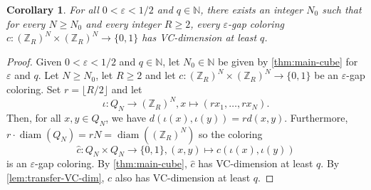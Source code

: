 \documentclass[11pt]{article}
\DeclareMathOperator{\diam}{diam}
\newtheorem{corollary}[theorem]{Corollary}
\theoremstyle{remark}
\begin{document}
\begin{corollary}\label{cor:main-torus}
    For all $0 < \varepsilon < 1/2$ and $q \in \mathbb{N}$, there exists an integer $N_0$ such that for every $N \geq N_0$ and every integer $R \geq 2$, every $\varepsilon$-gap coloring $c : (\mathbb{Z}_R)^N \times (\mathbb{Z}_R)^N \to \{0, 1\}$ has VC-dimension at least $q$.
\end{corollary}

\begin{proof}
    Given $0 < \varepsilon < 1/2$ and $q \in \mathbb{N}$, let $N_0 \in \mathbb{N}$ be given by \cref{thm:main-cube} for $\varepsilon$ and $q$.
    Let $N \geq N_0$, let $R \geq 2$ and let $c : (\mathbb{Z}_R)^N \times (\mathbb{Z}_R)^N \to \{0, 1\}$ be an $\varepsilon$-gap coloring.
    Set $r = \lfloor R/2\rfloor$ and let \[\iota : Q_N \to (\mathbb{Z}_R)^N, x \mapsto (rx_1, \ldots, rx_N).\]
    Then, for all $x, y \in Q_N$, we have $d(\iota(x), \iota(y)) = rd(x, y)$.
    Furthermore, $r \cdot \diam(Q_N) = rN = \diam((\mathbb{Z}_R)^N)$ so the coloring \[\widehat{c} : Q_N \times Q_N \to \{0, 1\}, (x, y) \mapsto c(\iota(x), \iota(y))\] is an $\varepsilon$-gap coloring.
    By \cref{thm:main-cube}, $\widehat{c}$ has VC-dimension at least $q$.
    By \cref{lem:transfer-VC-dim}, $c$ also has VC-dimension at least $q$.
\end{proof}


    
    
\end{document}
